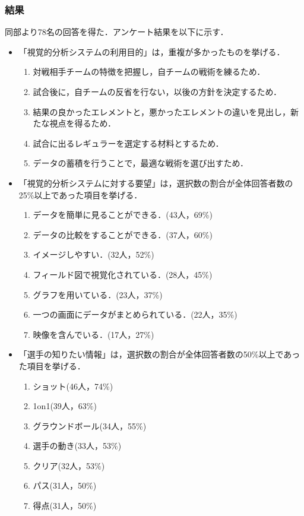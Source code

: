 \documentclass[sotsuron]{kuee}
\begin{document}
			\subsubsection{結果}
				同部より78名の回答を得た．アンケート結果を以下に示す．
				\begin{itemize}
					\item 「視覚的分析システムの利用目的」は，重複が多かったものを挙げる．
						\begin{enumerate}
						\item 対戦相手チームの特徴を把握し，自チームの戦術を練るため．
						\item 試合後に，自チームの反省を行ない，以後の方針を決定するため．
						\item 結果の良かったエレメントと，悪かったエレメントの違いを見出し，新たな視点を得るため．
						\item 試合に出るレギュラーを選定する材料とするため．
						\item データの蓄積を行うことで，最適な戦術を選び出すため．
						\end{enumerate}
					\item 「視覚的分析システムに対する要望」は，選択数の割合が全体回答者数の25\%以上であった項目を挙げる．
						\begin{enumerate}
						\item データを簡単に見ることができる．(43人，69\%)
						\item データの比較をすることができる．(37人，60\%)
						\item イメージしやすい．(32人，52\%)
						\item フィールド図で視覚化されている．(28人，45\%)
						\item グラフを用いている．(23人，37\%)
						\item 一つの画面にデータがまとめられている．(22人，35\%)
						\item 映像を含んでいる．(17人，27\%)
						\end{enumerate}
					\item 「選手の知りたい情報」は，選択数の割合が全体回答者数の50\%以上であった項目を挙げる．
						\begin{enumerate}
						\item ショット(46人，74\%)
						\item 1on1(39人，63\%)
						\item グラウンドボール(34人，55\%)
						\item 選手の動き(33人，53\%)
						\item クリア(32人，53\%)
						\item パス(31人，50\%)
						\item 得点(31人，50\%)
						\end{enumerate}
				\end{itemize}
\end{document}
